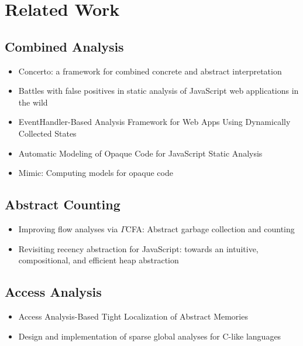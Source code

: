 \section{Related Work}\label{sec:related}

\todo

\subsection{Combined Analysis}

\begin{itemize}
  \item Concerto: a framework for combined concrete and abstract
    interpretation~\cite{concerto}
  \item Battles with false positives in static analysis of JavaScript web
    applications in the wild~\cite{battles}
  \item EventHandler-Based Analysis Framework for Web Apps Using Dynamically
    Collected States~\cite{eha}
  \item Automatic Modeling of Opaque Code for JavaScript Static
    Analysis~\cite{opaque-model}
  \item Mimic: Computing models for opaque code~\cite{mimic}
\end{itemize}

\subsection{Abstract Counting}

\begin{itemize}
  \item Improving flow analyses via $\Gamma$CFA: Abstract garbage collection and
    counting~\cite{abstract-gc-counting}
  \item Revisiting recency abstraction for JavaScript: towards an intuitive,
    compositional, and efficient heap abstraction~\cite{revisit-recency}
\end{itemize}

\subsection{Access Analysis}

\begin{itemize}
  \item Access Analysis-Based Tight Localization of Abstract
    Memories~\cite{func-local}
  \item Design and implementation of sparse global analyses for C-like
    languages~\cite{sparse}
\end{itemize}
